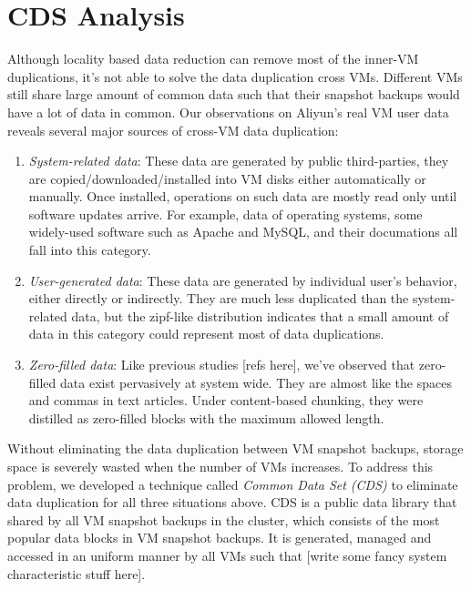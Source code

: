 \section{CDS Analysis}
Although locality based data reduction can remove most of the inner-VM duplications,
it's not able to solve the data duplication cross VMs. Different VMs still share large amount
of common data such that their snapshot backups would have a lot of data in common.
Our observations on Aliyun's real VM user data reveals several major sources of cross-VM data duplication:
  \begin{enumerate}
  \item \emph{System-related data}: These data are generated by public third-parties, they are copied/downloaded/installed into VM disks either automatically or manually. Once installed, operations on such data are mostly read only until software updates arrive. For example, data of operating systems, some widely-used software such as Apache and MySQL, and their documations all fall into this category.
  \item \emph{User-generated data}: These data are generated by individual user's behavior, either directly or indirectly. They are much less duplicated than the system-related data, but the zipf-like distribution indicates that a small amount of data in this category could represent most of data duplications.
  \item \emph{Zero-filled data}: Like previous studies [refs here], we've observed that zero-filled data exist pervasively at system wide. They are almost like the spaces and commas in text articles. Under content-based chunking, they were distilled as zero-filled blocks with the maximum allowed length. 
  \end{enumerate}

Without eliminating the data duplication between VM snapshot backups, storage space is severely wasted when the number of VMs increases.
To address this problem, we developed a technique called \emph{Common Data Set (CDS)} to eliminate data duplication for all three situations above. 
CDS is a public data library that shared by all VM snapshot backups in the cluster, 
which consists of the most popular data blocks in VM snapshot backups. It is generated, 
managed and accessed in an uniform manner by all VMs such that [write some fancy system characteristic stuff here].

